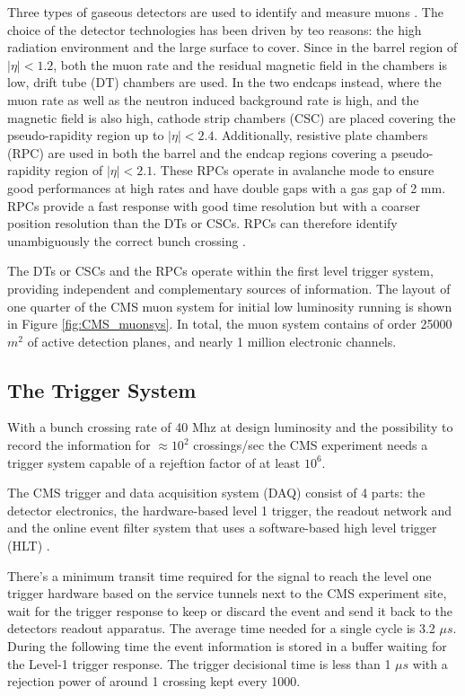 Three types of gaseous detectors are used to identify and measure muons \cite{CMS:1997dma}. The choice of the detector technologies has been driven by teo reasons: the high radiation environment and the large surface to cover. Since in the barrel region of $|\eta| < 1.2$, both the muon rate and the residual magnetic ﬁeld in the chambers is low, drift tube (DT) chambers are used. In the two endcaps instead, where the muon rate as well as the neutron induced background rate is high, and the magnetic ﬁeld is also high, cathode strip chambers (CSC) are placed covering the pseudo-rapidity region up to $|\eta| < 2.4$. Additionally, resistive plate chambers (RPC) are used in both the barrel and the endcap regions covering a pseudo-rapidity region of $|\eta| < 2.1$. These RPCs operate in avalanche mode to ensure good performances at high rates and have double gaps with a gas gap of 2 mm. RPCs provide a fast response with good time resolution but with a coarser position resolution than the DTs or CSCs. RPCs can therefore identify unambiguously the correct bunch crossing \cite{Chatrchyan:2009hg}.

The DTs or CSCs and the RPCs operate within the ﬁrst level trigger system, providing independent and complementary sources of information.
The layout of one quarter of the CMS muon system for initial low luminosity running is shown in Figure \ref{fig:CMS_muonsys}. In total, the muon system contains of order 25000 $m^{2}$ of active detection planes, and nearly 1 million electronic channels.

\clearpage

\subsection{The Trigger System}

With a bunch crossing rate of 40 Mhz at design luminosity and the possibility to record the information for $\approx 10^{2}$ crossings/sec the CMS experiment needs a trigger system capable of a rejeftion factor of at least $10^{6}$.

The CMS trigger and data acquisition system (DAQ) consist of 4 parts: the detector electronics, the hardware-based level 1 trigger, the readout network and and the online event filter system that uses a software-based high level trigger (HLT) \cite{bib:cmstdr:trigger}.

There's a minimum transit time required for the signal to reach the level one trigger hardware based on the service tunnels next to the CMS experiment site, wait for the trigger response to keep or discard the event and send it back to the detectors readout apparatus. The average time needed for a single cycle is 3.2 $\mu s$. During the following time the event information is stored in a buffer waiting for the Level-1 trigger response. The trigger decisional time is less than 1 $\mu s$ with a rejection power of around 1 crossing kept every 1000.

